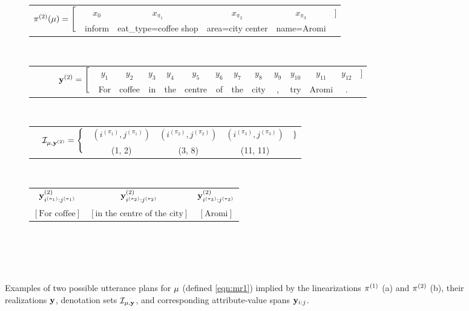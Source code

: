 \begin{figure}

~\\
~\\

\begin{subfigure}{\textwidth}
\caption{~~~~~~~~~~~~~~~~~~~~~~~~~~~~~~~~~~~~~~~~~~~~~~~~~~~~~~~~~~~~~~~~~~~~~~~~~~~~~~~~~~~~~~~~~~~~~~~~~~~~~~~~~~~~~~~~~~~~~~~~~~~~~~~~~~~~~~~~~~~~~~~~~~~~~~~~~~~~~~~~~~~~~~~~~}
\begin{tabular}{cccccc}
\multirow{2}{*}{$\pi^{(2)}(\mu) = \Bigg[$} & $x_0$ &   $x_{\pi_1}$ & $x_{\pi_2}$ & $x_{\pi_3}$ & \multirow{2}{*}{$\Bigg]$}\\
& inform & eat\_type=coffee shop & area=city center & name=Aromi\\
\end{tabular}

~\\[5pt]

\begin{tabular}{cccccccccccccc}
\multirow{2}{*}{~~~~~~$\mathbf{y}^{(2)} = \Bigg[$} & $y_1$ & $y_2$ & $y_3$ & $y_4$ & $y_5$ & $y_6$ & $y_7$ & $y_8$ & $y_9$ & $y_{10}$ & $y_{11}$& $y_{12}$ & \multirow{2}{*}{$\Bigg]$} \\
&For & coffee & in & the & centre & of & the & city & , & try & Aromi & .\\
\end{tabular}

~\\[5pt]

\begin{tabular}{ccccc}
 \multirow{2}{*}{~~$\mathcal{I}_{\mu,\mathbf{y}^{(2)}} = \Bigg\{$} & $(i^{(\pi_1)},j^{(\pi_1)})$ & 
    $(i^{(\pi_2)},j^{(\pi_2)})$ & 
    $(i^{(\pi_3)},j^{(\pi_3)})$ & \multirow{2}{*}{$\Bigg\}$}  \\
   &  (1, 2) & (3, 8) & (11, 11) 
\end{tabular}

~\\[5pt]

\begin{tabular}{ccc}
$\mathbf{y}^{(2)}_{i^{(\pi_1)}:j^{(\pi_1)}}$ & 
$\mathbf{y}^{(2)}_{i^{(\pi_2)}:j^{(\pi_2)}}$ &
$\mathbf{y}^{(2)}_{i^{(\pi_3)}:j^{(\pi_3)}}$   \\
    $\left[\textrm{For coffee}\right]$ & $\left[\textrm{in the centre of the city}\right]$ &
        $\left[\textrm{Aromi}\right]$ \\ 
\end{tabular}
\end{subfigure}

~\\

\caption{Examples of two possible utterance plans for $\mu$ (defined \autoref{eqn:mr1}) implied by
the linearizations $\pi^{(1)}$ (a) and $\pi^{(2)}$ (b), their realizations $\mathbf{y}$, denotation sets $\mathcal{I}_{\mu,\mathbf{y}}$, and corresponding
attribute-value spans $\mathbf{y}_{i:j}$.}
\label{fig:explans}
\end{figure}

